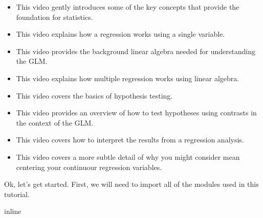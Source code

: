 \documentclass[letterpaper,10pt,english]{sphinxmanual}
\begin{document}
\begin{itemize}
\item {} 
 This video gently introduces some of the key concepts that provide the foundation for statistics.

\item {} 
 This video explains how a regression works using a single variable.

\item {} 
 This video provides the background linear algebra needed for understanding the GLM.

\item {} 
 This video explains how multiple regression works using linear algebra.

\item {} 
 This video covers the basics of hypothesis testing.

\item {} 
 This video provides an overview of how to test hypotheses using contrasts in the context of the GLM.

\item {} 
 This video covers how to interpret the results from a regression analysis.

\item {} 
 This video covers a more subtle detail of why you might consider mean centering your continuour regression variables.

\end{itemize}

Ok, let’s get started. First, we will need to import all of the modules used in this tutorial.

\begin{sphinxVerbatim}[commandchars=\\\{\}]
 inline

 
 
   
   
   
   
   
   
\end{sphinxVerbatim}
\end{document}
